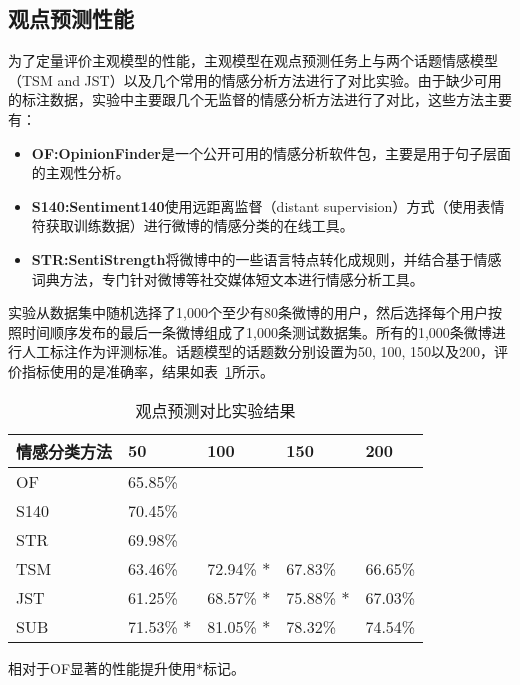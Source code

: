 \subsection{观点预测性能}
为了定量评价主观模型的性能，主观模型在观点预测任务上与两个话题情感模型（TSM and JST）以及几个常用的情感分析方法进行了对比实验。由于缺少可用的标注数据，实验中主要跟几个无监督的情感分析方法进行了对比，这些方法主要有：
\begin{itemize}
\item \textbf{OF:OpinionFinder}是一个公开可用的情感分析软件包，主要是用于句子层面的主观性分析。
\item \textbf{S140:Sentiment140}使用远距离监督（distant supervision）方式（使用表情符获取训练数据）进行微博的情感分类的在线工具。
\item \textbf{STR:SentiStrength}将微博中的一些语言特点转化成规则，并结合基于情感词典方法，专门针对微博等社交媒体短文本进行情感分析工具。
\end{itemize}

实验从数据集中随机选择了1,000个至少有80条微博的用户，然后选择每个用户按照时间顺序发布的最后一条微博组成了1,000条测试数据集。所有的1,000条微博进行人工标注作为评测标准。话题模型的话题数分别设置为50, 100, 150以及200，评价指标使用的是准确率，结果如表~\ref{tab5-2}所示。

\begin{table}[htb]
\centering
\caption{观点预测对比实验结果}
\label{tab5-2}
\begin{tabular}{|l|l|l|l|l|}
\hline
情感分类方法 & 50 & 100 & 150 & 200\\
\hline
OF &  65.85\%& & & \\
\hline
S140 &  70.45\%& & & \\\hline
STR &  69.98\%& & & \\\hline
TSM & 63.46\%& 72.94\% $ \ast $  &67.83\% & 66.65\% \\\hline
JST & 61.25\% & 68.57\% $ \ast $ & 75.88\%  $ \ast $ & 67.03\%\\\hline
SUB & 71.53\% $ \ast $ & 81.05\% $ \ast $ & 78.32\% & 74.54\%\\
\hline
\end{tabular}
\begin{tablenotes}
  \centering
  \footnotesize
  \item 相对于OF显著的性能提升使用$ \ast $标记。\\
\end{tablenotes}
\end{table}


